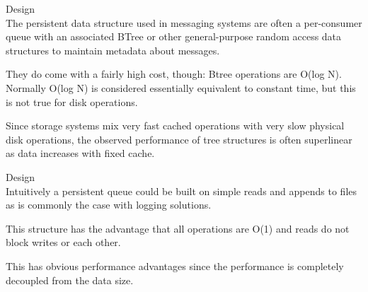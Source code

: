 \begin{frame}[plain,t]{Design} %
     \\
    \vspace{2ex}
    The persistent data structure used in messaging systems are often a per-consumer queue with an associated BTree or other general-purpose random access data structures to maintain metadata about messages.
    
    \vspace{2ex}
    They do come with a fairly high cost, though: Btree operations are O(log N). Normally O(log N) is considered essentially equivalent to constant time, but this is not true for disk operations. 
    
    \vspace{2ex}
    Since storage systems mix very fast cached operations with very slow physical disk operations, the observed performance of tree structures is often superlinear as data increases with fixed cache.
    
    
    
\end{frame}
\begin{frame}[plain,t]{Design} %
     \\
    \vspace{2ex}
    Intuitively a persistent queue could be built on simple reads and appends to files as is commonly the case with logging solutions. 
    
    \vspace{2ex}
    This structure has the advantage that all operations are O(1) and reads do not block writes or each other. 
    
    \vspace{2ex}
    This has obvious performance advantages since the performance is completely decoupled from the data size.
    
    
    
\end{frame}
